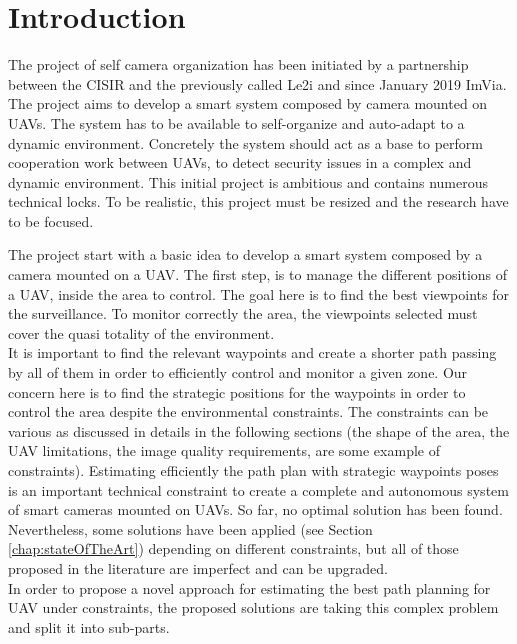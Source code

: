 \chapter{Introduction}\label{chap:Intro}



The project of self camera organization has been initiated by a partnership between the CISIR and the previously called Le2i and since January 2019 ImVia. The project aims to develop a smart system composed by camera mounted on UAVs. The system has to be available to self-organize and auto-adapt to a dynamic environment. Concretely the system should act as a base to perform cooperation work between UAVs, to detect security issues in a complex and dynamic environment. This initial project is ambitious and contains numerous technical locks. To be realistic, this project must be resized and the research have to be focused.%

The project start with a basic idea to develop a smart system composed by a camera mounted on a UAV. 
The first step, is to manage the different positions of a UAV, inside the area to control. The goal here is to find the best viewpoints  for the surveillance. To monitor correctly the area, the viewpoints selected must cover the quasi totality  of  the environment.\\
It is important to find the relevant waypoints and create a shorter path passing by all of them in order to efficiently control and monitor a given zone. Our concern here is to find the strategic positions for the waypoints in order to control the area despite the environmental constraints. The constraints can be various as discussed in details in the following sections (the shape of the area, the UAV limitations, the image quality requirements, are some example of constraints). 
Estimating efficiently the path plan with strategic waypoints poses is an important technical constraint to create a complete and autonomous system of smart cameras mounted on UAVs. So far, no optimal solution has been found. Nevertheless, some solutions have been applied (see Section \ref{chap:stateOfTheArt}) depending on different constraints, but all of those proposed in the literature are imperfect and can be upgraded. \\
In order to propose a novel approach for estimating the best path planning for UAV under constraints, the proposed solutions are taking this complex problem and split it into sub-parts. 

